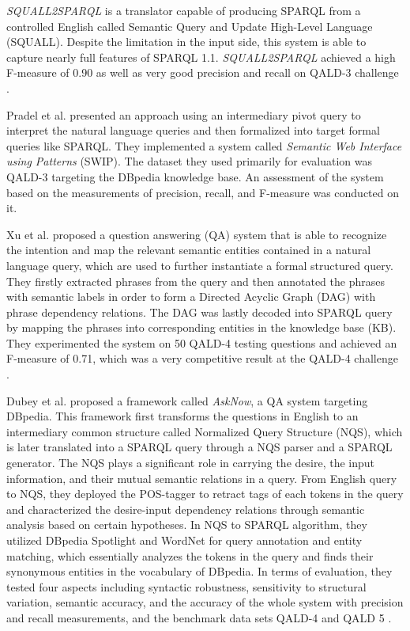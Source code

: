 \textit{SQUALL2SPARQL} \cite{ferre:hal-00943522} is a translator capable of producing SPARQL from a controlled English called Semantic Query and Update High-Level Language (SQUALL). Despite the limitation in the input side, this system is able to capture nearly full features of SPARQL 1.1. \textit{SQUALL2SPARQL} achieved a high F-measure of 0.90 as well as very good precision and recall on QALD-3 challenge \cite{cabrio2013qald}.

Pradel et al. \cite{Pradel2013} presented an approach using an intermediary pivot query to interpret the natural language queries and then formalized into target formal queries like SPARQL. They implemented a system called \textit{Semantic Web Interface using Patterns} (SWIP). The dataset they used primarily for evaluation was QALD-3 targeting the DBpedia knowledge base. An assessment of the system based on the measurements of precision, recall, and F-measure was conducted on it. 

Xu et al. \cite{Xu2014} proposed a question answering (QA) system that is able to recognize the intention and map the relevant semantic entities contained in a natural language query, which are used to further instantiate a formal structured query. They firstly extracted phrases from the query and then  annotated the phrases with semantic labels in order to form a Directed Acyclic Graph (DAG) with phrase dependency relations. The DAG was lastly decoded into SPARQL query by mapping the phrases into corresponding entities in the knowledge base (KB). They experimented the system on 50 QALD-4 testing questions and achieved an F-measure of 0.71, which was a very competitive result at the QALD-4 challenge \cite{unger:hal-01086472}.

Dubey et al. \cite{Dubey2016} proposed a framework called \textit{AskNow}, a QA system targeting DBpedia. This framework first transforms the questions in English to an intermediary common structure called Normalized Query Structure (NQS), which is later translated into a SPARQL query through a NQS parser and a SPARQL generator. The NQS plays a significant role in carrying the desire, the input information, and their mutual semantic relations in a query. From English query to NQS, they deployed the POS-tagger to retract tags of each tokens in the query and characterized the desire-input dependency relations through semantic analysis based on certain hypotheses. In NQS to SPARQL algorithm, they utilized DBpedia Spotlight \cite{isem2013daiber} and WordNet \cite{miller1998wordnet} for query annotation and entity matching, which essentially analyzes the tokens in the query and finds their synonymous entities in the vocabulary of DBpedia. In terms of evaluation, they tested four aspects including syntactic robustness, sensitivity to structural variation, semantic accuracy, and the accuracy of the whole system with precision and recall measurements, and the benchmark data sets QALD-4 \cite{unger:hal-01086472} and QALD 5 \cite{Unger2015}.

